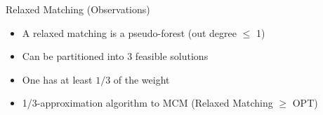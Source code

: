 \begin{frame}{Relaxed Matching (Observations)}
\begin{itemize}
  \item<1> A relaxed matching is a pseudo-forest (out degree $\leq$ 1)
  \item<2> Can be partitioned into 3 feasible solutions
  \item<3> One has at least $1/3$ of the weight 
  \item<8> 1/3-approximation algorithm to MCM
  {\tiny (Relaxed Matching $\geq$ OPT)}
\end{itemize}
\centering

\end{frame}